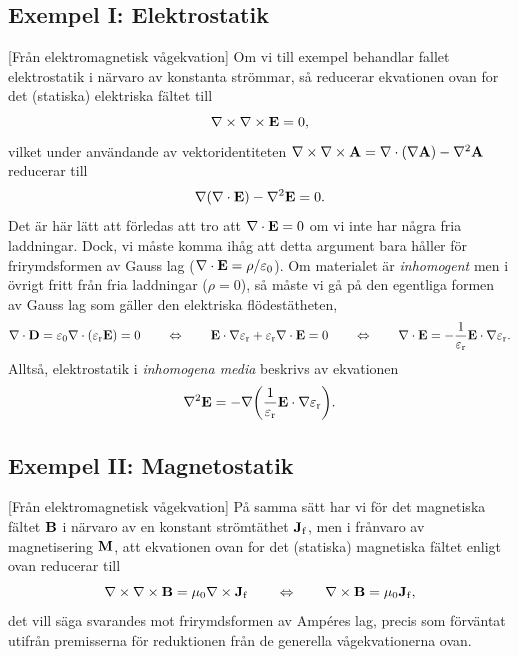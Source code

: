 {{{{{\subsection{Exempel I: Elektrostatik}
[Fr{\aa}n elektromagnetisk v{\aa}gekvation]
Om vi till exempel behandlar fallet elektrostatik i n{\"a}rvaro av konstanta
str{\"o}mmar, s{\aa} reducerar ekvationen ovan for det (statiska) elektriska
f{\"a}ltet till
$$
  \nabla\times\nabla\times{\bf E}=0,
$$
vilket under anv{\"a}ndande av vektoridentiteten
$\nabla\times\nabla\times{\bf A}=\nabla\cdot(\nabla{\bf A})-\nabla^2{\bf A}$
reducerar till
$$
  \nabla(\nabla\cdot{\bf E})-\nabla^2{\bf E}=0.
$$
Det {\"a}r h{\"a}r l{\"a}tt att f{\"o}rledas att tro att $\nabla\cdot{\bf E}=0$
om vi inte har n{\aa}gra fria laddningar. Dock, vi m{\aa}ste komma ih{\aa}g att
detta argument bara h{\aa}ller f{\"o}r frirymdsformen av Gauss lag
($\nabla\cdot{\bf E}=\rho/\varepsilon_0$). Om materialet {\"a}r {\it inhomogent}
men i {\"o}vrigt fritt fr{\aa}n fria laddningar ($\rho=0$), s{\aa} m{\aa}ste vi
g{\aa} p{\aa} den egentliga formen av Gauss lag som g{\"a}ller den elektriska
fl{\"o}dest{\"a}theten,
$$
  \nabla\cdot{\bf D}
    =\varepsilon_0\nabla\cdot(\varepsilon_{\rm r}{\bf E})=0
  \qquad\Leftrightarrow\qquad
  {\bf E}\cdot\nabla\varepsilon_{\rm r}+
    \varepsilon_{\rm r}\nabla\cdot{\bf E}=0
  \qquad\Leftrightarrow\qquad
  \nabla\cdot{\bf E}=
    -{{1}\over{\varepsilon_{\rm r}}}{\bf E}\cdot\nabla\varepsilon_{\rm r}.
$$
Allts{\aa}, elektrostatik i {\it inhomogena media} beskrivs av ekvationen
$$
  \nabla^2{\bf E}=-\nabla\bigg(
      {{1}\over{\varepsilon_{\rm r}}}{\bf E}\cdot\nabla\varepsilon_{\rm r}
    \bigg).
$$

\subsection{Exempel II: Magnetostatik}
[Fr{\aa}n elektromagnetisk v{\aa}gekvation]
P{\aa} samma s{\"a}tt har vi f{\"o}r det magnetiska f{\"a}ltet ${\bf B}$ i
n{\"a}rvaro av en konstant str{\"o}mt{\"a}thet ${\bf J}_{\rm f}$, men i
fr{\aa}nvaro av magnetisering ${\bf M}$, att ekvationen ovan for det (statiska)
magnetiska f{\"a}ltet enligt ovan reducerar till
$$
  \nabla\times\nabla\times{\bf B}=\mu_0\nabla\times{\bf J}_{\rm f}
  \qquad\Leftrightarrow\qquad
  \nabla\times{\bf B}=\mu_0{\bf J}_{\rm f},
$$
det vill s{\"a}ga svarandes mot frirymdsformen av Amp\'eres lag, precis som
f{\"o}rv{\"a}ntat utifr{\aa}n premisserna f{\"o}r reduktionen fr{\aa}n de
generella v{\aa}gekvationerna ovan.
\vfill\eject

}}}}}
